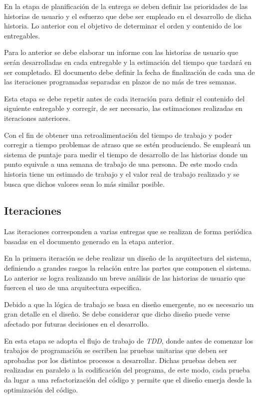 En la etapa de planificación de la entrega se deben definir las prioridades de las historias de usuario y el esfuerzo que debe ser empleado en el desarrollo de dicha historia. Lo anterior con el objetivo de determinar el orden y contenido de los entregables.

Para lo anterior se debe elaborar un informe con las historias de usuario que serán desarrolladas en cada entregable y la estimación del tiempo que tardará en ser completado. El documento debe definir la fecha de finalización de cada una de las iteraciones programadas separadas en plazos de no más de tres semanas. 

Esta etapa se debe repetir antes de cada iteración para definir el contenido del siguiente entregable y corregir, de ser necesario, las estimaciones realizadas en iteraciones anteriores.

Con el fin de obtener una retroalimentación del tiempo de trabajo y poder corregir a tiempo problemas de atraso que se estén produciendo. Se empleará un sistema de puntaje para medir el tiempo de desarrollo de las historias donde un punto equivale a una semana de trabajo de una persona. De este modo cada historia tiene un estimado de trabajo y el valor real de trabajo realizado y se busca que dichos valores sean lo más similar posible.

\subsection{Iteraciones}

Las iteraciones corresponden a varias entregas que se realizan de forma periódica basadas en el documento generado en la etapa anterior.

En la primera iteración se debe realizar un diseño de la arquitectura del sistema, definiendo a grandes rasgos la relación entre las partes que componen el sistema. Lo anterior se logra realizando un breve análisis de las historias de usuario que fuercen el uso de una arquitectura especifica. 

Debido a que la lógica de trabajo se basa en diseño emergente, no es necesario un gran detalle en el diseño. Se debe considerar que dicho diseño puede verse afectado por futuras decisiones en el desarrollo.

En esta etapa se adopta el flujo de trabajo de \emph{TDD}, donde antes de comenzar los trabajos de programación se escriben las pruebas unitarias que deben ser aprobadas por los distintos procesos a desarrollar. Dichas pruebas deben ser realizadas en paralelo a la codificación del programa, de este modo, cada prueba da lugar a una refactorización del código y permite que el diseño emerja desde la optimización del código.


